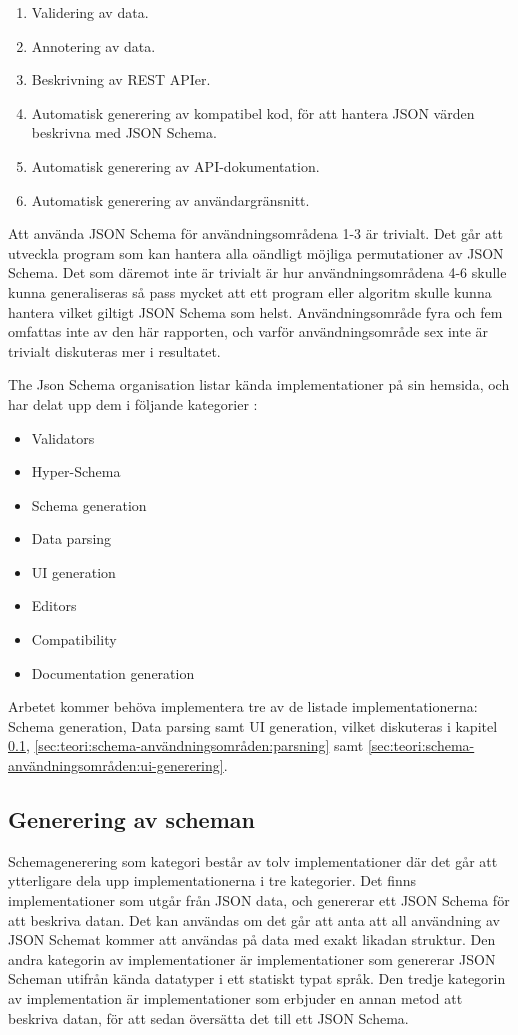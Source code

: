 \begin{enumerate}
	\item Validering av data.
	\item Annotering av data.
	\item Beskrivning av REST APIer.
	\item Automatisk generering av kompatibel kod, för att hantera JSON värden beskrivna med JSON Schema.
	\item Automatisk generering av API-dokumentation.
	\item Automatisk generering av användargränsnitt.
\end{enumerate}

\noindent
Att använda JSON Schema för användningsområdena 1-3 är trivialt. Det går att utveckla program som kan hantera alla oändligt möjliga permutationer av JSON Schema. Det som däremot inte är trivialt är hur användningsområdena 4-6 skulle kunna generaliseras så pass mycket att ett program eller algoritm skulle kunna hantera vilket giltigt JSON Schema som helst. Användningsområde fyra och fem omfattas inte av den här rapporten, och varför användningsområde sex inte är trivialt diskuteras mer i resultatet.

The Json Schema organisation listar kända implementationer på sin hemsida, och har delat upp dem i följande kategorier \cite{TheJSONSchemaorganisation}:
\begin{itemize}
	\item Validators
	\item Hyper-Schema
	\item Schema generation
	\item Data parsing
	\item UI generation
	\item Editors
	\item Compatibility
	\item Documentation generation
\end{itemize}
\noindent
Arbetet kommer behöva implementera tre av de listade implementationerna: Schema generation, Data parsing samt UI generation, vilket diskuteras i kapitel \ref{sec:teori:schema-användningsområden:generering}, \ref{sec:teori:schema-användningsområden:parsning} samt \ref{sec:teori:schema-användningsområden:ui-generering}.

\subsection{Generering av scheman}
\label{sec:teori:schema-användningsområden:generering}
Schemagenerering som kategori består av tolv implementationer där det går att ytterligare dela upp implementationerna i tre kategorier. Det finns implementationer som utgår från JSON data, och genererar ett JSON Schema för att beskriva datan. Det kan användas om det går att anta att all användning av JSON Schemat kommer att användas på data med exakt likadan struktur. Den andra kategorin av implementationer är implementationer som genererar JSON Scheman utifrån kända datatyper i ett statiskt typat språk. Den tredje kategorin av implementation är implementationer som erbjuder en annan metod att beskriva datan, för att sedan översätta det till ett JSON Schema. \cite{TheJSONSchemaorganisation}

